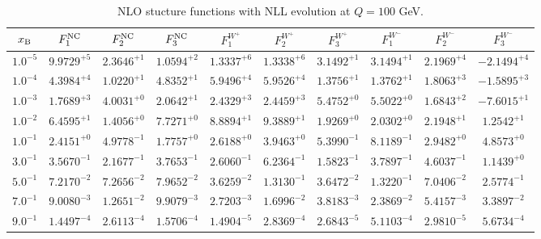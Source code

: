 \begin{table}[h]
\begin{adjustbox}{width=\textwidth}
\begin{tabular}{|c||c|c|c|c|c|c|c|c|c|}
\hline
$x_{\rm B}$ & $F_1^{\rm NC}$ & $F_2^{\rm NC}$ & $F_3^{\rm NC}$ & $F_1^{W^+}$ & $F_2^{W^+}$ & $F_3^{W^+}$ & $F_1^{W^-}$ & $F_2^{W^-}$ & $F_3^{W^-}$ \\
\hline
$ 1.0^{-5}$ & $ 9.9729^{+5}$ & $ 2.3646^{+1}$ & $ 1.0594^{+2}$ & $ 1.3337^{+6}$ & $ 1.3338^{+6}$ & $ 3.1492^{+1}$ & $ 3.1494^{+1}$ & $ 2.1969^{+4}$ & $-2.1494^{+4}$ \\
$ 1.0^{-4}$ & $ 4.3984^{+4}$ & $ 1.0220^{+1}$ & $ 4.8352^{+1}$ & $ 5.9496^{+4}$ & $ 5.9526^{+4}$ & $ 1.3756^{+1}$ & $ 1.3762^{+1}$ & $ 1.8063^{+3}$ & $-1.5895^{+3}$ \\
$ 1.0^{-3}$ & $ 1.7689^{+3}$ & $ 4.0031^{+0}$ & $ 2.0642^{+1}$ & $ 2.4329^{+3}$ & $ 2.4459^{+3}$ & $ 5.4752^{+0}$ & $ 5.5022^{+0}$ & $ 1.6843^{+2}$ & $-7.6015^{+1}$ \\
$ 1.0^{-2}$ & $ 6.4595^{+1}$ & $ 1.4056^{+0}$ & $ 7.7271^{+0}$ & $ 8.8894^{+1}$ & $ 9.3889^{+1}$ & $ 1.9269^{+0}$ & $ 2.0302^{+0}$ & $ 2.1948^{+1}$ & $ 1.2542^{+1}$ \\
$ 1.0^{-1}$ & $ 2.4151^{+0}$ & $ 4.9778^{-1}$ & $ 1.7757^{+0}$ & $ 2.6188^{+0}$ & $ 3.9463^{+0}$ & $ 5.3990^{-1}$ & $ 8.1189^{-1}$ & $ 2.9482^{+0}$ & $ 4.8573^{+0}$ \\
$ 3.0^{-1}$ & $ 3.5670^{-1}$ & $ 2.1677^{-1}$ & $ 3.7653^{-1}$ & $ 2.6060^{-1}$ & $ 6.2364^{-1}$ & $ 1.5823^{-1}$ & $ 3.7897^{-1}$ & $ 4.6037^{-1}$ & $ 1.1439^{+0}$ \\
$ 5.0^{-1}$ & $ 7.2170^{-2}$ & $ 7.2656^{-2}$ & $ 7.9652^{-2}$ & $ 3.6259^{-2}$ & $ 1.3130^{-1}$ & $ 3.6472^{-2}$ & $ 1.3220^{-1}$ & $ 7.0406^{-2}$ & $ 2.5774^{-1}$ \\
$ 7.0^{-1}$ & $ 9.0080^{-3}$ & $ 1.2651^{-2}$ & $ 9.9079^{-3}$ & $ 2.7203^{-3}$ & $ 1.6996^{-2}$ & $ 3.8183^{-3}$ & $ 2.3869^{-2}$ & $ 5.4157^{-3}$ & $ 3.3897^{-2}$ \\
$ 9.0^{-1}$ & $ 1.4497^{-4}$ & $ 2.6113^{-4}$ & $ 1.5706^{-4}$ & $ 1.4904^{-5}$ & $ 2.8369^{-4}$ & $ 2.6843^{-5}$ & $ 5.1103^{-4}$ & $ 2.9810^{-5}$ & $ 5.6734^{-4}$ \\
\hline
\end{tabular}
\end{adjustbox}\caption{NLO stucture functions with NLL evolution at $Q = 100$ GeV.}
\label{tab:N1LO-Q100}
\end{table}


